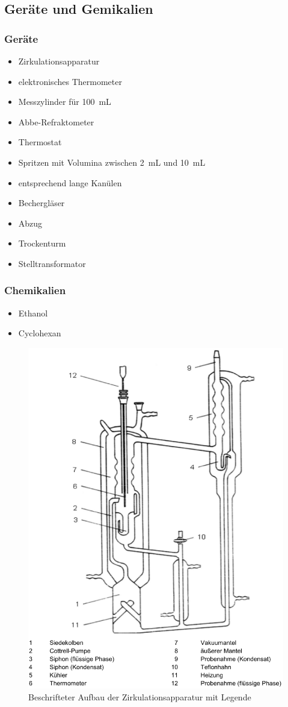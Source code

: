 \subsection*{Geräte und Gemikalien}

\subsubsection*{Geräte}
\begin{itemize}
	\item Zirkulationsapparatur
	\item elektronisches Thermometer
	\item Messzylinder für \SI{100}{\milli\liter}
	\item Abbe-Refraktometer
	\item Thermostat
	\item Spritzen mit Volumina zwischen \SI{2}{\milli\liter} und \SI{10}{\milli\liter}
	\item entsprechend lange Kanülen
	\item Bechergläser
	\item Abzug
	\item Trockenturm
	\item Stelltransformator
\end{itemize}
\subsubsection*{Chemikalien}
\begin{itemize}
	\item Ethanol
	\item Cyclohexan
\end{itemize}
\begin{figure}[h!]
	\centering
	\includegraphics[width=0.7\linewidth]{img/zirkulationsapparatur}
	\caption{Beschrifteter Aufbau der Zirkulationsapparatur mit Legende}
	\label{fig:zirkulationsapparatur}
\end{figure}